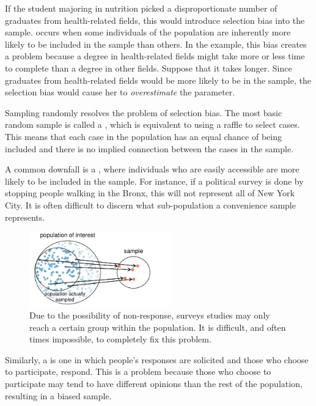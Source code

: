 If the student majoring in nutrition picked a disproportionate number of graduates from health-related fields, this would introduce selection bias into the sample.  occurs when some individuals of the population are inherently more likely to be included in the sample than others. In the example, this bias creates a problem because a degree in health-related fields might take more or less time to complete than a degree in other fields. Suppose that it takes longer. Since graduates from health-related fields would be more likely to be in the sample, the selection bias would cause her to \emph{overestimate} the parameter.

Sampling randomly resolves the problem of selection bias. The most basic random sample is called a , which is equivalent to using a raffle to select cases. This means that each case in the population has an equal chance of being included and there is no implied connection between the cases in the sample.

A common downfall is a , where individuals who are easily accessible are more likely to be included in the sample. For instance, if a political survey is done by stopping people walking in the Bronx, this will not represent all of New York City. It is often difficult to discern what sub-population a convenience sample represents.

\begin{figure}[h]
\centering
\includegraphics[width=0.55\textwidth]{ch_data_collection/figures/popToSample/surveySample}
\caption{Due to the possibility of non-response, surveys studies may only reach a certain group within the population. It is difficult, and often times impossible, to completely fix this problem.}
\label{surveySample}
\end{figure}

Similarly, a  is one in which people's responses are solicited and those who choose to participate, respond. This is a problem because those who choose to participate may tend to have different opinions than the rest of the population, resulting in a biased sample.

